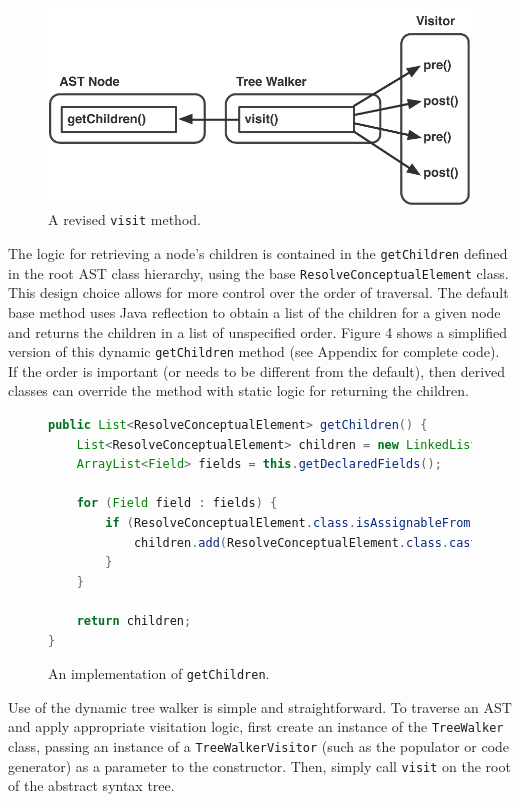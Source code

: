\documentclass[times]{speauth}
\begin{document}
\begin{figure}[!htb]
\centering
\includegraphics[scale=.60]{figures/prepostprepost.pdf}
\caption{A revised \texttt{visit} method.}
\end{figure}

The logic for retrieving a node's children is contained in the \texttt{getChildren} defined in the root AST class hierarchy, using the base \texttt{ResolveConceptualElement} class. This design choice allows for more control over the order of traversal. The default base method uses Java reflection to obtain a list of the children for a given node and returns the children in a list of unspecified order. Figure 4 shows a simplified version of this dynamic \texttt{getChildren} method (see Appendix for complete code). If the order is important (or needs to be different from the default), then derived classes can override the method with static logic for returning the children.

\begin{figure}[!htb]
\centering
\begin{minipage}{.80\textwidth}
\begin{lstlisting}[language=java]
public List<ResolveConceptualElement> getChildren() {
    List<ResolveConceptualElement> children = new LinkedList<>();
    ArrayList<Field> fields = this.getDeclaredFields();
    
    for (Field field : fields) {
        if (ResolveConceptualElement.class.isAssignableFrom(field.getType())) {
            children.add(ResolveConceptualElement.class.cast(field.get(this)));
        }
    }
    
    return children;
}
\end{lstlisting}
\end{minipage}
\caption{An implementation of \texttt{getChildren}.}
\label{fig:getchildren}
\end{figure}


Use of the dynamic tree walker is simple and straightforward. To traverse an AST and apply appropriate visitation logic, first create an instance of the \texttt{TreeWalker} class, passing an instance of a \texttt{TreeWalkerVisitor} (such as the populator or code generator) as a parameter to the constructor. Then, simply call \texttt{visit} on the root of the abstract syntax tree.
\end{document}
